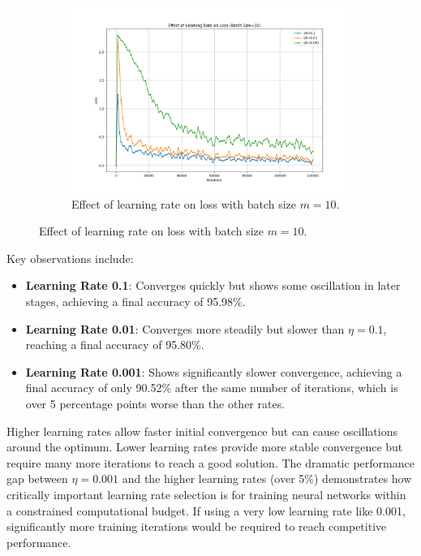 \documentclass{article}
\begin{document}
\begin{figure}[H]
\begin{subfigure}[t]{0.48\textwidth}
        \centering
        \includegraphics[width=1.15\textwidth]{plots/part2a_learning_rate_loss.png}
        \caption{Effect of learning rate on loss with batch size $m=10$.}
        \label{fig:learning_rate_loss}

    \end{subfigure}
\end{figure}


\noindent Key observations include:
\begin{itemize}
    \item \textbf{Learning Rate 0.1}: Converges quickly but shows some oscillation 
    in later stages, achieving a final accuracy of 95.98\%.
    \item \textbf{Learning Rate 0.01}: Converges more steadily but slower than $\eta=0.1$, 
    reaching a final accuracy of 95.80\%.
    \item \textbf{Learning Rate 0.001}: Shows significantly slower convergence, 
    achieving a final accuracy of only 90.52\% after the same number of iterations, 
    which is over 5 percentage points worse than the other rates.
\end{itemize}


\noindent Higher learning rates allow faster initial convergence but can cause 
oscillations around the optimum. Lower learning rates provide more stable 
convergence but require many more iterations to reach a good solution. The dramatic 
performance gap between $\eta=0.001$ and the higher learning rates (over 5\%) 
demonstrates how critically important learning rate selection is for training 
neural networks within a constrained computational budget. If using a very low 
learning rate like 0.001, significantly more training iterations would be 
required to reach competitive performance.
\end{document}

